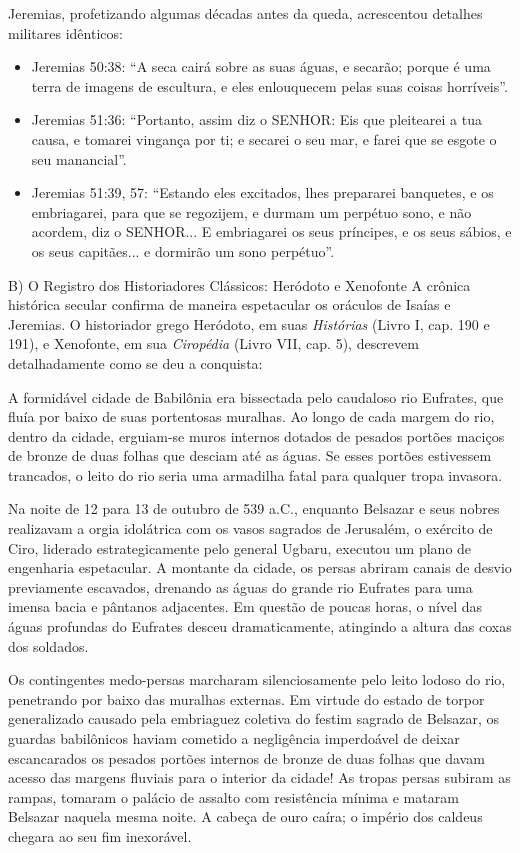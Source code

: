 Jeremias, profetizando algumas décadas antes da queda, acrescentou detalhes militares idênticos:
\begin{itemize}
  \item Jeremias 50:38: ``A seca cairá sobre as suas águas, e secarão; porque é uma terra de imagens de escultura, e eles enlouquecem pelas suas coisas horríveis''.
  \item Jeremias 51:36: ``Portanto, assim diz o SENHOR: Eis que pleitearei a tua causa, e tomarei vingança por ti; e secarei o seu mar, e farei que se esgote o seu manancial''.
  \item Jeremias 51:39, 57: ``Estando eles excitados, lhes prepararei banquetes, e os embriagarei, para que se regozijem, e durmam um perpétuo sono, e não acordem, diz o SENHOR... E embriagarei os seus príncipes, e os seus sábios, e os seus capitães... e dormirão um sono perpétuo''.
\end{itemize}


B) O Registro dos Historiadores Clássicos: Heródoto e Xenofonte
A crônica histórica secular confirma de maneira espetacular os oráculos de Isaías e Jeremias. O historiador grego Heródoto, em suas \textit{Histórias} (Livro I, cap. 190 e 191), e Xenofonte, em sua \textit{Ciropédia} (Livro VII, cap. 5), descrevem detalhadamente como se deu a conquista:

A formidável cidade de Babilônia era bissectada pelo caudaloso rio Eufrates, que fluía por baixo de suas portentosas muralhas. Ao longo de cada margem do rio, dentro da cidade, erguiam-se muros internos dotados de pesados portões maciços de bronze de duas folhas que desciam até as águas. Se esses portões estivessem trancados, o leito do rio seria uma armadilha fatal para qualquer tropa invasora.

Na noite de 12 para 13 de outubro de 539 a.C., enquanto Belsazar e seus nobres realizavam a orgia idolátrica com os vasos sagrados de Jerusalém, o exército de Ciro, liderado estrategicamente pelo general Ugbaru, executou um plano de engenharia espetacular. A montante da cidade, os persas abriram canais de desvio previamente escavados, drenando as águas do grande rio Eufrates para uma imensa bacia e pântanos adjacentes. Em questão de poucas horas, o nível das águas profundas do Eufrates desceu dramaticamente, atingindo a altura das coxas dos soldados.

Os contingentes medo-persas marcharam silenciosamente pelo leito lodoso do rio, penetrando por baixo das muralhas externas. Em virtude do estado de torpor generalizado causado pela embriaguez coletiva do festim sagrado de Belsazar, os guardas babilônicos haviam cometido a negligência imperdoável de deixar escancarados os pesados portões internos de bronze de duas folhas que davam acesso das margens fluviais para o interior da cidade! As tropas persas subiram as rampas, tomaram o palácio de assalto com resistência mínima e mataram Belsazar naquela mesma noite. A cabeça de ouro caíra; o império dos caldeus chegara ao seu fim inexorável.



